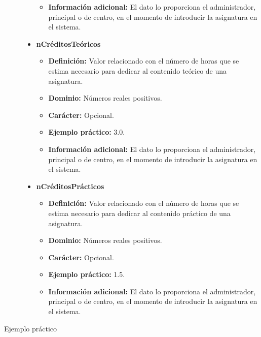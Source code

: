 \begin{description}
\begin{itemize}
\begin{itemize}
         \item \textbf{Información adicional:} El dato lo proporciona el administrador, principal o de
         centro, en el momento de introducir la asignatura en el sistema.
      \end{itemize}
   \item \textbf{nCréditosTeóricos}
      \begin{itemize}
         \item \textbf{Definición:} Valor relacionado con el número de horas que se estima necesario para dedicar al contenido teórico de una asignatura.
         \item \textbf{Dominio:} Números reales positivos.
         \item \textbf{Carácter:}  Opcional.
         \item \textbf{Ejemplo práctico:} 3.0.
         \item \textbf{Información adicional:} El dato lo proporciona el administrador, principal o de
         centro, en el momento de introducir la asignatura en el sistema.
      \end{itemize}
   \item \textbf{nCréditosPrácticos}
      \begin{itemize}
         \item \textbf{Definición:} Valor relacionado con el número de horas que se estima necesario para dedicar al contenido práctico de una asignatura.
         \item \textbf{Dominio:} Números reales positivos.
         \item \textbf{Carácter:}  Opcional.
         \item \textbf{Ejemplo práctico:} 1.5.
         \item \textbf{Información adicional:} El dato lo proporciona el administrador, principal o de
         centro, en el momento de introducir la asignatura en el sistema.
      \end{itemize}

   \end{itemize}

   \item[Ejemplo práctico]


\end{description}
